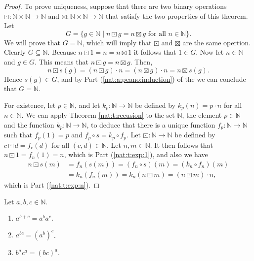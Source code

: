 \begin{proof}
	To prove uniqueness, suppose that there are two binary operations $\boxdot: \mathbb{N} \times \mathbb{N} \to \mathbb{N}$ and $\boxtimes: \mathbb{N} \times \mathbb{N} \to \mathbb{N}$ that satisfy the two properties of this theorem. Let
	$$
		G = \{ g \in \mathbb{N} \mid n \boxdot g = n \boxtimes g \text{ for all } n \in \mathbb{N} \}.
	$$
	We will prove that $G = \mathbb{N}$, which will imply that $\boxdot$ and $\boxtimes$ are the same opertion. Clearly $G \subseteq \mathbb{N}$. Because $n \boxdot 1 = n = n \boxtimes 1$ it follows that $1 \in G$. Now let $n \in \mathbb{N}$ and $g \in G$. This means that $n \boxdot g = n \boxtimes g$. Then,
	$$
		n \boxdot s(g) = (n \boxdot g) \cdot n = (n \boxtimes g) \cdot n = n \boxtimes s(g).
	$$
	Hence $s(g) \in G$, and by Part (\ref{nat:a:peano:induction}) of the  we can conclude that $G = \mathbb{N}$.

	For existence, let $p \in \mathbb{N}$, and let $k_{p}: \mathbb{N} \to \mathbb{N}$ be defined by $k_{p}(n) = p \cdot n$ for all $n \in \mathbb{N}$. We can apply Theorem \ref{nat:t:recusion} to the set $\mathbb{N}$, the element $p \in \mathbb{N}$ and the function $k_{p}: \mathbb{N} \to \mathbb{N}$, to deduce that there is a unique function $f_{p}: \mathbb{N} \to \mathbb{N}$ such that $f_{p}(1) = p$ and $f_{p} \circ s = k_{p} \circ f_{p}$. Let $\boxdot: \mathbb{N} \to \mathbb{N}$ be defined by $c \boxdot d = f_{c}(d)$ for all $(c, d) \in \mathbb{N}$. Let $n, m \in \mathbb{N}$. It then follows that $n \boxdot 1 = f_{n}(1) = n$, which is Part (\ref{nat:t:exp:1}), and also we have
	\begin{align*}
		n \boxdot s(m) & = f_{n}(s(m)) = (f_{n} \circ s)(m) = (k_{n} \circ f_{n})(m)     \\
		               & = k_{n}(f_{n}(m)) = k_{n}(n \boxdot m) = (n \boxdot m) \cdot n,
	\end{align*}
	which is Part (\ref{nat:t:exp:n}).
\end{proof}

\begin{theorem}
	\label{nat:t:exp_props}
	Let $a, b, c \in \mathbb{N}$.
	\begin{enumerate}
		\item \label{nat:t:exp_props:1}
		      $a^{b + c} = a^b a^c$.
		\item \label{nat:t:exp_props:2}
		      $a^{b c} = (a^b)^c$.
		\item \label{nat:t:exp_props:3}
		      $b^a c^a = (b c)^a$.
	\end{enumerate}
\end{theorem}


